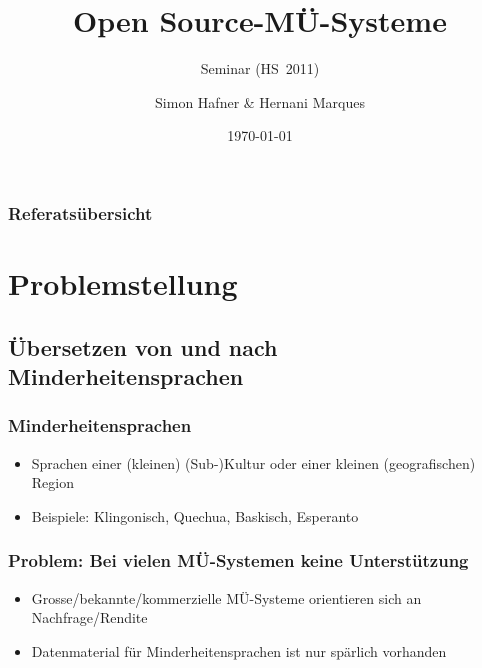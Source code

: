 \documentclass{beamer}
\title{Open Source-MÜ-Systeme}
\subtitle{Seminar \q{Maschinelle \"Ubersetzung} (HS~2011)}
\author{Simon Hafner \& Hernani Marques}
\date{\today}
\begin{document}
  \maketitle

\begin{frame}
\frametitle{Referatsübersicht}
\tableofcontents
\end{frame}

\section{Problemstellung}
\subsection{Übersetzen von und nach Minderheitensprachen}
\begin{frame}
\frametitle{Minderheitensprachen}
\begin{itemize}
\item Sprachen einer (kleinen) (Sub-)Kultur oder einer kleinen (geografischen) Region
\item Beispiele: Klingonisch, Quechua, Baskisch, Esperanto
\end{itemize}
\end{frame}
\begin{frame}
\frametitle{Problem: Bei vielen MÜ-Systemen keine Unterstützung}
\begin{itemize}
\item Grosse/bekannte/kommerzielle MÜ-Systeme orientieren sich an Nachfrage/Rendite
\item Datenmaterial für Minderheitensprachen ist nur spärlich vorhanden
\end{itemize}
\end{frame}
\end{document}
